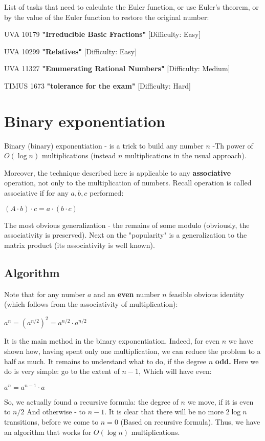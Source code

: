 List of tasks that need to calculate the Euler function, or use Euler's theorem, or by the value of the Euler function to restore the original number:

UVA 10179 \textbf{"Irreducible Basic Fractions"} [Difficulty: Easy]

UVA 10299 \textbf{"Relatives"} [Difficulty: Easy]

UVA 11327 \textbf{"Enumerating Rational Numbers"} [Difficulty: Medium]

TIMUS 1673 \textbf{"tolerance for the exam"} [Difficulty: Hard]

\section{ Binary exponentiation }
Binary (binary) exponentiation - is a trick to build any number $n$ -Th power of $O (\log n)$ multiplications (instead $n$ multiplications in the usual approach).

Moreover, the technique described here is applicable to any \textbf{associative} operation, not only to the multiplication of numbers. Recall operation is called associative if for any $a, b, c$ performed:

$(A \cdot b) \cdot c = a \cdot (b \cdot c)$

The most obvious generalization - the remains of some modulo (obviously, the associativity is preserved). Next on the "popularity" is a generalization to the matrix product (its associativity is well known).

\subsection{ Algorithm }

Note that for any number $a$ and an \textbf{even} number $n$ feasible obvious identity (which follows from the associativity of multiplication):

$a ^ n = (a ^ {n / 2}) ^ 2 = a ^ {n / 2} \cdot a ^ {n / 2}$

It is the main method in the binary exponentiation. Indeed, for even $n$ we have shown how, having spent only one multiplication, we can reduce the problem to a half as much.
It remains to understand what to do, if the degree $n$ \textbf{odd.} Here we do is very simple: go to the extent of $n-1$, Which will have even:

$a ^ n = a ^ {n-1} \cdot a$

So, we actually found a recursive formula: the degree of $n$ we move, if it is even to $n / 2$ And otherwise - to $n-1$. It is clear that there will be no more $2 \log n$ transitions, before we come to $n = 0$ (Based on recursive formula). Thus, we have an algorithm that works for $O (\log n)$ multiplications.

